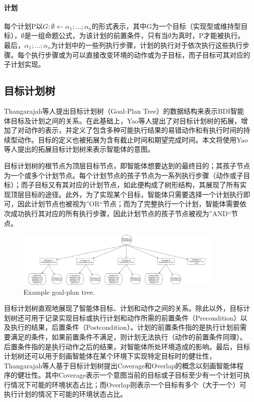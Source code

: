 \paragraph{计划}
每个计划P以$G:\emptyset \gets \alpha_1; \dots;\alpha_n$的形式表示，其中G为一个目标（实现型或维持型目标），$\emptyset$是一组命题公式，为该计划的前置条件，只有当$\emptyset$为真时，P才能被执行。最后，$\alpha_1; \dots;\alpha_n$为计划中的一些列执行步骤，计划的执行对于依次执行这些执行步骤。每个执行步骤或为可以直接改变环境的动作或为子目标，而子目标可其对应的子计划实现。

\subsection{目标计划树}
Thangarajah等人提出目标计划树（Goal-Plan Tree）\cite{DBLP:journals/jar/ThangarajahP11,DBLP:conf/ijcai/ThangarajahPW03,DBLP:conf/ijcai/ThangarajahPW03,DBLP:conf/ecai/ThangarajahWPF02}的数据结构来表示BDI智能体目标及计划之间的关系。在此基础上，Yao等人提出了对目标计划树的拓展\cite{DBLP:conf/atal/YaoSL16}，增加了对动作的表示，并定义了包含多种可能执行结果的易错动作和有执行时间的持续型动作。目标的定义也被拓展为含有截止时间和期望完成时间。本文将使用Yao等人提出的拓展目标计划树来表示智能体的意图。

目标计划树的根节点为顶层目标节点，即智能体想要达到的最终目的；其孩子节点为一个或多个计划节点。每个计划节点的孩子节点为一系列执行步骤（动作或子目标）；而子目标又有其对应的计划节点，如此便构成了树形结构，其展现了所有实现顶层目标的途径。此外，为了实现某个目标，智能体只需要选择一个计划执行即可，因此计划节点也被视为”OR“节点；而为了完整执行一个计划，智能体需要依次成功执行其对应的所有执行步骤，因此计划节点的孩子节点被视为”AND“节点。

\begin{figure}[htb]
\centering
\includegraphics[width=0.9\textwidth]{./figs/MarsRover_GPT}
\caption{Example goal-plan tree.}
\label{fig:gpt}
\end{figure}

目标计划树直观地展现了智能体目标、计划和动作之间的关系。除此以外，目标计划树还可用于记录实现目标或执行计划和动作所需的前置条件（Precondition）以及执行的结果，后置条件（Postcondition）。计划的前置条件指的是执行计划前需要满足的条件，如果前置条件不满足，则计划无法执行（动作的前置条件同理）。后置条件指的是执行动作之后的结果，对智能体所处环境造成的影响。最后，目标计划树还可以用于刻画智能体在某个环境下实现特定目标时的健壮性，Thangarajah等人基于目标计划树提出Coverage和Overlap的概念以刻画智能体程序的健壮性。其中Coverage表示一个意图当前的目标或子目标至少有一个计划可执行情况下可能的环境状态占比；而Overlap则表示一个目标有多个（大于一个）可执行计划的情况下可能的环境状态占比。

